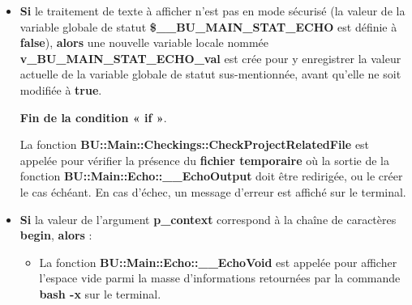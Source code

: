 \documentclass[a4paper,10pt]{article}
\begin{document}
\begin{itemize}
    \item
    {
        \begin{justify}
            \textbf{\color{cond}Si} le traitement de texte à afficher n'est pas en mode sécurisé (la valeur de la variable globale de statut \textbf{\color{vars}\$\_\_BU\_MAIN\_STAT\_ECHO} est définie à \textbf{false}), \textbf{\color{cond}alors} une nouvelle variable locale nommée \textbf{\color{vars}v\_BU\_MAIN\_STAT\_ECHO\_val} est crée pour y enregistrer la valeur actuelle de la variable globale de statut sus-mentionnée, avant qu'elle ne soit modifiée à \textbf{true}.
        \end{justify}

        \setlength{\parskip}{1em}

        \begin{justify}
            \textbf{\color{cond}Fin de la condition « if »}.
        \end{justify}
    }

    \begin{justify}\setlength{\parskip}{2em}
        La fonction \textbf{\color{func}BU::Main::Checkings::CheckProjectRelatedFile} est appelée pour vérifier la présence du \textbf{\color{path}fichier temporaire} où la sortie de la fonction \textbf{\color{func}BU::Main::Echo::\_\_EchoOutput} doit être redirigée, ou le créer le cas échéant. En cas d'échec, un message d'erreur est affiché sur le terminal.
    \end{justify}

    \item
    {
        \setlength{\parskip}{2em}

        \begin{justify}
            \textbf{\color{cond}Si} la valeur de l'argument \textbf{\color{vars}p\_context} correspond à la chaîne de caractères \textbf{begin}, \textbf{\color{cond}alors} :
        \end{justify}

        \setlength{\parskip}{1em}

        \begin{itemize}
            \item
            {
                \begin{justify}
                    La fonction \textbf{\color{func}BU::Main::Echo::\_\_EchoVoid} est appelée pour afficher l'espace vide parmi la masse d'informations retournées par la commande \textbf{\color{cmds}bash -x} sur le terminal.
                \end{justify}
            }


\end{itemize}}
\end{itemize}
\end{document}
